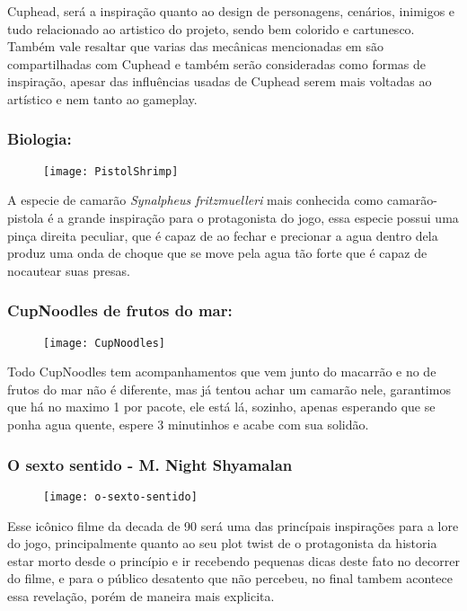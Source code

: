             Cuphead, será a inspiração quanto ao design de personagens, cenários, inimigos e tudo relacionado ao artistico do projeto, sendo bem colorido e cartunesco.\\
            Também vale resaltar que varias das mecânicas mencionadas em  são compartilhadas com Cuphead e também serão consideradas como formas de inspiração, apesar das influências usadas de Cuphead serem mais voltadas ao artístico e nem tanto ao gameplay.\\

        \subsubsection{Biologia:}
            \begin{figure}[H]
                \texttt{[image: PistolShrimp]}
            \centering
            \end{figure}

            A especie de camarão \textit{Synalpheus fritzmuelleri} mais conhecida como camarão-pistola é a grande inspiração para o protagonista do jogo, essa especie possui uma pinça direita peculiar, que é capaz de ao fechar e precionar a agua dentro dela produz uma onda de choque que se move pela agua tão forte que é capaz de nocautear suas presas.
 
        \subsubsection{CupNoodles de frutos do mar:}
            \begin{figure}[H]
                \texttt{[image: CupNoodles]}
            \centering
            \end{figure}
            
            Todo CupNoodles tem acompanhamentos que vem junto do macarrão e no de frutos do mar não é diferente, mas já tentou achar um camarão nele, garantimos que há no maximo 1 por pacote, ele está lá, sozinho, apenas esperando que se ponha agua quente, espere 3 minutinhos e acabe com sua solidão.

        \subsubsection{O sexto sentido - M. Night Shyamalan}
            \begin{figure}[H]
                \texttt{[image: o-sexto-sentido]}
            \centering
            \end{figure}
            Esse icônico filme da decada de 90 será uma das princípais inspirações para a lore do jogo, principalmente quanto ao seu plot twist de o protagonista da historia estar morto desde o princípio e ir recebendo pequenas dicas deste fato no decorrer do filme, e para o público desatento que não percebeu, no final tambem acontece essa revelação, porém de maneira mais explicita. \\
 

